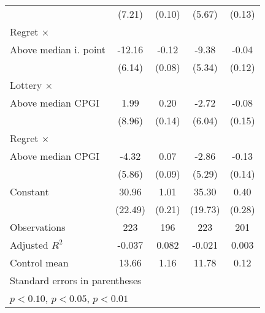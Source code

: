 \begin{table}[htbp]
\begin{tabular}{l*{4}{c}}
                &   (7.21)         &   (0.10)         &   (5.67)         &   (0.13)         \\
\addlinespace
Regret $\times$ \\ Above median i. point&   -12.16\sym{**} &    -0.12         &    -9.38\sym{*}  &    -0.04         \\
                &   (6.14)         &   (0.08)         &   (5.34)         &   (0.12)         \\
\addlinespace
Lottery $\times$ \\ Above median CPGI&     1.99         &     0.20         &    -2.72         &    -0.08         \\
                &   (8.96)         &   (0.14)         &   (6.04)         &   (0.15)         \\
\addlinespace
Regret $\times$ \\ Above median CPGI&    -4.32         &     0.07         &    -2.86         &    -0.13         \\
                &   (5.86)         &   (0.09)         &   (5.29)         &   (0.14)         \\
\addlinespace
Constant        &    30.96         &     1.01\sym{***}&    35.30\sym{*}  &     0.40         \\
                &  (22.49)         &   (0.21)         &  (19.73)         &   (0.28)         \\
\midrule
Observations    &      223         &      196         &      223         &      201         \\
Adjusted \(R^{2}\)&   -0.037         &    0.082         &   -0.021         &    0.003         \\
Control mean    &    13.66         &     1.16         &    11.78         &     0.12         \\
\bottomrule
\multicolumn{5}{l}{\footnotesize Standard errors in parentheses}\\
\multicolumn{5}{l}{\footnotesize \sym{*} \(p<0.10\), \sym{**} \(p<0.05\), \sym{***} \(p<0.01\)}\\
\end{tabular}
\end{table}
